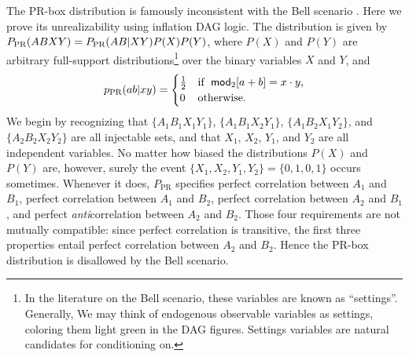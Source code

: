 {The PR-box distribution is famously inconsistent with the Bell scenario \cite{PROriginal,PRUnit}. Here we prove its unrealizability using inflation DAG logic. The distribution  is given by ${P_{\text{PR}}}\parenths{A B X Y} = P_{\text{PR}}\parenths{A B | X Y} P(X) P(Y)$, where $P(X)$ and $P(Y)$ are arbitrary full-support distributions\footnote{In the literature on the Bell scenario, these variables are known as ``settings''. Generally, We may think of endogenous observable variables as settings, coloring them light green in the DAG figures. Settings variables are natural candidates for conditioning on.} over the binary variables $X$ and $Y$, and
\begin{align}\begin{split}\label{eq:PRbox}
p_{\text{PR}}\parens{a b |x y}=\begin{cases}\tfrac{1}{2}&\text{if }\; \SmallNamedFunction[2]{mod}{a+b}=x\cdot y, \\ 0&\text{otherwise}.\end{cases}
\end{split}\end{align}
We begin by recognizing that $\{A_1 B_1 X_1 Y_1\}$, $\{A_1 B_1 X_2 Y_1\}$, $\{A_1 B_2 X_1 Y_2\}$, and $\{A_2 B_2 X_2 Y_2\}$ are all injectable sets, and that $X_1$, $X_2$, $Y_1$, and $Y_2$ are all independent variables.
No matter how biased the distributions $P(X)$ and $P(Y)$ are, however, surely the event $\{X_1, X_2, Y_1, Y_2\}=\{0, 1, 0, 1\}$  occurs sometimes. Whenever it does, $P_{\text{PR}}$ specifies perfect correlation between $A_1$ and $B_1$, perfect correlation between $A_1$ and $B_2$, perfect correlation between $A_2$ and $B_1$, and perfect \emph{anti}correlation between $A_2$ and $B_2$. Those four requirements are not mutually compatible: since perfect correlation is transitive, the first three properties entail perfect correlation between $A_2$ and $B_2$. Hence the PR-box distribution is disallowed by the Bell scenario.

}

